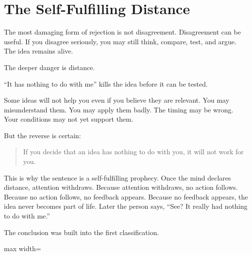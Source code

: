 \section*{The Self-Fulfilling Distance}

The most damaging form of rejection is not disagreement. Disagreement can be useful. If you disagree seriously, you may still think, compare, test, and argue. The idea remains alive.

The deeper danger is distance.

``It has nothing to do with me'' kills the idea before it can be tested.

Some ideas will not help you even if you believe they are relevant. You may misunderstand them. You may apply them badly. The timing may be wrong. Your conditions may not yet support them.

But the reverse is certain:

\begin{quote}
If you decide that an idea has nothing to do with you, it will not work for you.
\end{quote}

This is why the sentence is a self-fulfilling prophecy. Once the mind declares distance, attention withdraws. Because attention withdraws, no action follows. Because no action follows, no feedback appears. Because no feedback appears, the idea never becomes part of life. Later the person says, ``See? It really had nothing to do with me.''

The conclusion was built into the first classification.

\begin{center}
\begin{adjustbox}{max width=\linewidth}
\end{adjustbox}
\end{center}

